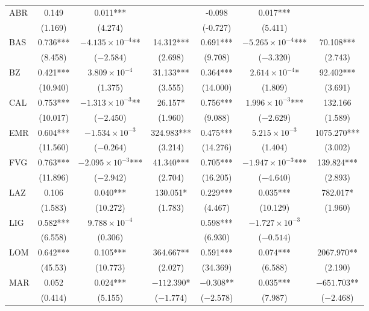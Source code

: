 \documentclass[12pt]{article}
\begin{document}
\begin{appendices}
\begin{longtable}{@{}lcccccc@{}}
            ABR & 0.149 & 0.011*** &  & -0.098 & 0.017*** &  \\ 
             & (1.169) & (4.274) &  & (-0.727) & (5.411) &  \\ 
            BAS & 0.736*** & $-4.135 \times 10^{-4}$** & 14.312*** & 0.691*** & $-5.265 \times 10^{-4}$*** & 70.108*** \\ 
             & (8.458) & ($-2.584$) & (2.698) & (9.708) & ($-3.320$) & (2.743) \\ 
            BZ & 0.421*** & $3.809 \times 10^{-4}$ & 31.133*** & 0.364*** & $2.614 \times 10^{-4}$* & 92.402*** \\ 
             & (10.940) & (1.375) & (3.555) & (14.000) & (1.809) & (3.691) \\ 
            CAL & 0.753*** & $-1.313 \times 10^{-3}$** & 26.157* & 0.756*** & $1.996 \times 10^{-3}$*** & 132.166 \\ 
             & (10.017) & ($-2.450$) & (1.960) & (9.088) & ($-2.629$) & (1.589) \\ 
            EMR & 0.604*** & $-1.534 \times 10^{-3}$ & 324.983*** & 0.475*** & $5.215 \times 10^{-3}$ & 1075.270*** \\ 
             & (11.560) & ($-0.264$) & (3.214) & (14.276) & (1.404) & (3.002) \\ 
            FVG & 0.763*** & $-2.095 \times 10^{-3}$*** & 41.340*** & 0.705*** & $-1.947 \times 10^{-3}$*** & 139.824*** \\ 
             & (11.896) & ($-2.942$) & (2.704) & (16.205) & ($-4.640$) & (2.893) \\ 
            LAZ & 0.106 & 0.040*** & 130.051* & 0.229*** & 0.035*** & 782.017* \\ 
             & (1.583) & (10.272) & (1.783) & (4.467) & (10.129) & (1.960) \\ 
            LIG & 0.582*** & $9.788 \times 10^{-4}$ &  & 0.598*** & $-1.727 \times 10^{-3}$ &  \\ 
             & (6.558) & (0.306) &  & (6.930) & ($-0.514$) &  \\ 
            LOM & 0.642*** & 0.105*** & 364.667** & 0.591*** & 0.074*** & 2067.970** \\ 
             & (45.53) & (10.773) & (2.027) & (34.369) & (6.588) & (2.190) \\ 
            MAR & 0.052 & 0.024*** & $-112.390$* & $-0.308$** & 0.035*** & $-651.703$** \\ 
             & (0.414) & (5.155) & ($-1.774$) & ($-2.578$) & (7.987) & ($-2.468$) \\ 

\end{longtable}
\end{appendices}
\end{document}
